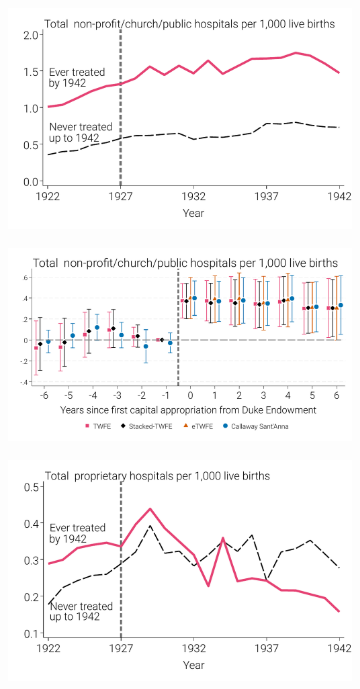 \documentclass[12pt]{article}
\begin{document}
\begin{figure}
\begin{minipage}{\linewidth}
\begin{subfigure}[b]{0.49\columnwidth}
    \includegraphics[width=\linewidth]{../analysis/output/appendix/figure_b1a2_likely_hospitals_by_year.pdf}  \end{subfigure}    
  \begin{subfigure}[b]{0.49\columnwidth}
    \includegraphics[width=\linewidth]{../analysis/output/appendix/figure_b1b2_likely_hospitals_first_stage.pdf}  \end{subfigure}  
  \begin{subfigure}[b]{0.49\columnwidth}
    \includegraphics[width=\linewidth]{../analysis/output/appendix/figure_b1a3_private_hospitals_by_year.pdf}  \end{subfigure}

\end{minipage}
\end{figure}
\end{document}
